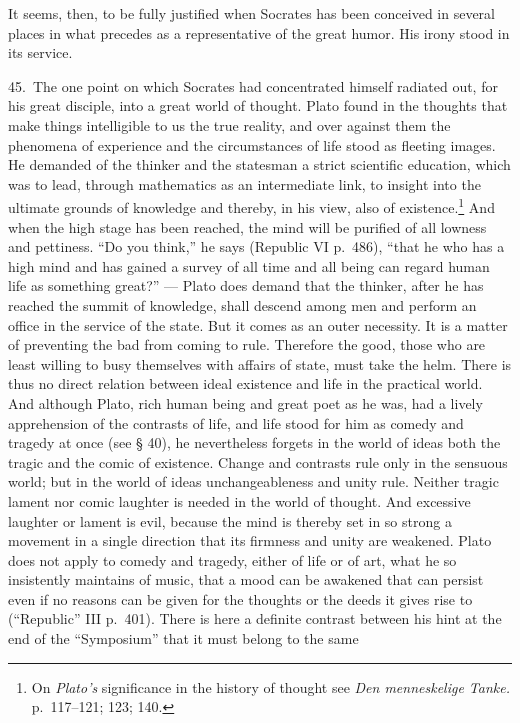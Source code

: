 \documentclass[12pt]{book}
\newcommand{\opage}[1]{\marginnote{\footnotesize\textit{[#1]}}}
\begin{document}
It seems, then, to be fully justified when Socrates has been conceived in several places in what
precedes as a representative of the great humor. His irony stood in its service.

45.~The one point on which Socrates had concentrated himself radiated out, for his great
disciple, into a great world of thought. Plato found in the thoughts that make things intelligible
to us the true reality, and over against them the phenomena of experience and the circumstances of
life stood as fleeting images. He demanded of the thinker and the statesman a strict scientific
education, which was to lead, through mathematics as an intermediate link, to insight into the
ultimate grounds of knowledge and thereby, in his view, also of existence.\footnote{On
\textit{Plato's} significance in the history of thought see \textit{Den menneskelige Tanke.}
p.~117--121; 123; 140.} And when the high stage has been reached, the mind will be purified of all
lowness and pettiness. ``Do you think,'' he says (Republic VI p.~486), ``that he who has a high mind
and has gained a survey of all time and all being can regard human life as something great?'' ---
Plato does demand that the thinker, after he has reached the summit of knowledge, shall descend
among men and perform an office in the service of the state. But it comes as an outer necessity. It
is a matter of preventing the bad from coming to rule. Therefore the good, those who are least
willing to busy themselves with affairs of state, must take the helm. There is thus no direct
relation between ideal existence and life in the practical world. And although Plato,
\opage{152}rich human being and great poet as he was, had a lively apprehension of the contrasts of
life, and life stood for him as comedy and tragedy at once (see § 40), he nevertheless forgets in
the world of ideas both the tragic and the comic of existence. Change and contrasts rule only in the
sensuous world; but in the world of ideas unchangeableness and unity rule. Neither tragic lament nor
comic laughter is needed in the world of thought. And excessive laughter or lament is evil, because
the mind is thereby set in so strong a movement in a single direction that its firmness and unity
are weakened. Plato does not apply to comedy and tragedy, either of life or of art, what he so
insistently maintains of music, that a mood can be awakened that can persist even if no reasons can
be given for the thoughts or the deeds it gives rise to (``Republic'' III p.~401). There is here a
definite contrast between his hint at the end of the ``Symposium'' that it must belong to the same
\end{document}
